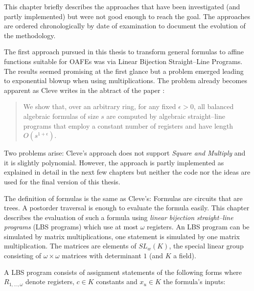 \label{sec:discontinued}

This chapter briefly describes the approaches that have been investigated (and
partly implemented) but were not good enough to reach the goal. The approaches
are ordered chronologically by date of examination to document the evolution of
the methodology.


%
%
\label{sec:using-lbs}

The first approach pursued in this thesis to transform general formulas to
affine functions suitable for OAFEs was via Linear Bijection Straight--Line
Programs.  The results seemed promising at the first glance but a problem
emerged leading to exponential blowup when using multiplications. The problem
already becomes apparent as Cleve writes in the abtract of the paper
\cite{cleve91}:

\begin{quote}
  We show that, over an arbitrary ring, for any fixed $\epsilon > 0$, all
  balanced algebraic formulas of size $s$ are computed by algebraic
  straight--line programs that employ a constant number of registers and have
  length $O(s^{1 + \epsilon})$.
\end{quote}

\noindent{}Two problems arise: Cleve's approach does not support \emph{Square
and Multiply}\cite{knuth81} and it is slightly polynomial. However, the approach
is partly implemented as explained in detail in the next few chapters but
neither the code nor the ideas are used for the final version of this thesis.

\label{sec:FormulasToMatrixMuls}

The definition of formulas is the same as Cleve's\cite{cleve91}: Formulas are
circuits that are trees. A postorder traversal is enough to evaluate the formula
easily. This chapter describes the evaluation of such a formula using
\emph{linear bijection straight--line programs} (LBS programs)\cite{cleve91}
which use at most $\omega$ registers. An LBS program can be simulated by matrix
multiplications, one statement is simulated by one matrix multiplication. The
matrices are elements of $SL_w(K)$, the special linear group consisting of
$\omega \times \omega$ matrices with determinant $1$ (and $K$ a field).

A LBS program consists of assignment statements of the following
forms where $R_{1,\ldots,\omega}$ denote registers, $c \in K$ constants and $x_u
\in K$ the formula's inputs:

